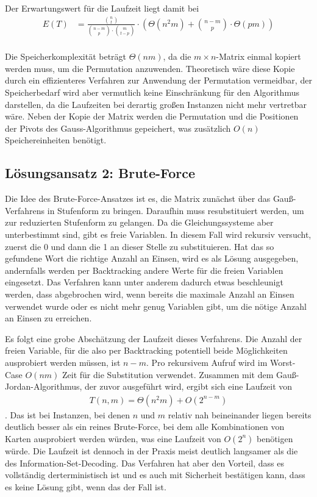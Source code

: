 \documentclass[a4paper,10pt,ngerman]{scrartcl}
\begin{document}
Der Erwartungswert für die Laufzeit liegt damit bei 
\begin{align*}
    E(T) &= \frac{\binom{n}{t}}{\binom{n-m}{p} \cdot \binom{m}{t-p}} \cdot \left(\Theta(n^2m) + \binom{n-m}{p}\cdot \Theta(pm)\right) \\
\end{align*}

Die Speicherkomplexität beträgt $\Theta(nm)$, da die $m \times n$-Matrix einmal kopiert werden muss, um die Permutation anzuwenden. Theoretisch wäre diese Kopie durch ein effizienteres Verfahren zur Anwendung der Permutation vermeidbar, der Speicherbedarf wird aber vermutlich keine Einschränkung für den Algorithmus darstellen, da die Laufzeiten bei derartig großen Instanzen nicht mehr vertretbar wäre. 
Neben der Kopie der Matrix werden die Permutation und die Positionen der Pivots des Gauss-Algorithmus gepeichert, was zusätzlich $O(n)$ Speichereinheiten benötigt. 

\subsection{Lösungsansatz 2: Brute-Force}
Die Idee des Brute-Force-Ansatzes ist es, die Matrix zunächst über das Gauß-Verfahrens in Stufenform zu bringen. Daraufhin muss resubstituiert werden, um zur reduzierten Stufenform zu gelangen. 
Da die Gleichungssysteme aber unterbestimmt sind, gibt es freie Variablen.
In diesem Fall wird rekursiv versucht, zuerst die 0 und dann die 1 an dieser Stelle zu substituieren. 
Hat das so gefundene Wort die richtige Anzahl an Einsen, wird es als Lösung ausgegeben, andernfalls werden per Backtracking andere Werte für die freien Variablen eingesetzt. 
Das Verfahren kann unter anderem dadurch etwas beschleunigt werden, dass abgebrochen wird, wenn bereits die maximale Anzahl an Einsen verwendet wurde oder es nicht mehr genug Variablen gibt, um die nötige Anzahl an Einsen zu erreichen. 

Es folgt eine grobe Abschätzung der Laufzeit dieses Verfahrens.
Die Anzahl der freien Variable, für die also per Backtracking potentiell beide Möglichkeiten ausprobiert werden müssen, ist $n-m$. Pro rekursivem Aufruf wird im Worst-Case $O(nm)$ Zeit für die Substitution verwendet. Zusammen mit dem Gauß-Jordan-Algorithmus, der zuvor ausgeführt wird, ergibt sich eine Laufzeit von 
\begin{align*}
    T(n,m) = \Theta(n^2m) + O(2^{n-m})
\end{align*}.
Das ist bei Instanzen, bei denen $n$ und $m$ relativ nah beineinander liegen bereits deutlich besser als ein reines Brute-Force, bei dem alle Kombinationen von Karten ausprobiert werden würden, was eine Laufzeit von $O(2^n)$ benötigen würde.
Die Laufzeit ist dennoch in der Praxis meist deutlich langsamer als die des Information-Set-Decoding.  
Das Verfahren hat aber den Vorteil, dass es vollständig derterministisch ist und es auch mit Sicherheit bestätigen kann, dass es keine Lösung gibt, wenn das der Fall ist. 
\end{document}
